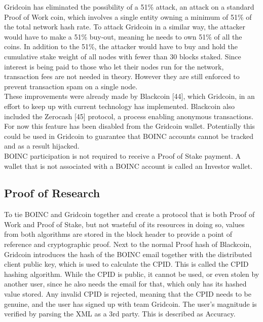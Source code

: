 Gridcoin has eliminated the possibility of a 51\% attack, an attack on a standard Proof of Work coin, which involves a single entity owning a minimum of 51\% of the total network hash rate. To attack Gridcoin in a similar way, the attacker would have to make a 51\% buy-out, meaning he needs to own 51\% of all the coins. In addition to the 51\%, the attacker would have to buy and hold the cumulative stake weight of all nodes with fewer than 30 blocks staked. Since interest is being paid to those who let their nodes run for the network, transaction fees are not needed in theory. However they are still enforced to prevent transaction spam on a single node.\\

These improvements were already made by Blackcoin [44], which Gridcoin, in an effort to keep up with current technology has implemented. Blackcoin also included the Zerocash [45] protocol, a process enabling anonymous transactions. For now this feature has been disabled from the Gridcoin wallet. Potentially this could be used in Gridcoin to guarantee that BOINC accounts cannot be tracked and as a result hijacked.\\

BOINC participation is not required to receive a Proof of Stake payment. A wallet that is not associated with a BOINC account is called an Investor wallet.

\subsection{Proof of Research}

To tie BOINC and Gridcoin together and create a protocol that is both Proof of Work and Proof of Stake, but not wasteful of its resources in doing so, values from both algorithms are stored in the block header to provide a point of reference and cryptographic proof. Next to the normal Proof hash of Blackcoin, Gridcoin introduces the hash of the BOINC email together with the distributed client public key, which is used to calculate the CPID. This is called the CPID hashing algorithm. While the CPID is public, it cannot be used, or even stolen by another user, since he also needs the email for that, which only has its hashed value stored. Any invalid CPID is rejected, meaning that the CPID needs to be genuine, and the user has signed up with team Gridcoin. The user's magnitude is verified by parsing the XML as a 3rd party. This is described as Accuracy.\\

